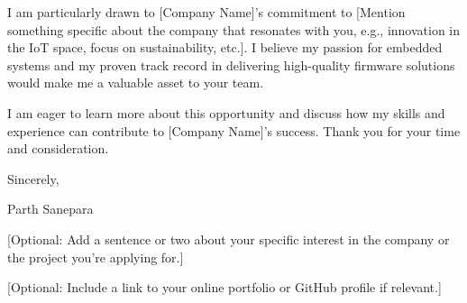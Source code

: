 \documentclass[letterpaper,11pt]{article}
\begin{document}
  I am particularly drawn to [Company Name]'s commitment to [Mention something specific about the company that resonates with you, e.g., innovation in the IoT space, focus on sustainability, etc.]. I believe my passion for embedded systems and my proven track record in delivering high-quality firmware solutions would make me a valuable asset to your team.

  I am eager to learn more about this opportunity and discuss how my skills and experience can contribute to [Company Name]'s success. Thank you for your time and consideration.

\vspace{1cm}

\begin{center}
  Sincerely,

  Parth Sanepara
\end{center}

\vspace{0.5cm}

  [Optional: Add a sentence or two about your specific interest in the company or the project you're applying for.]

  [Optional: Include a link to your online portfolio or GitHub profile if relevant.]
\end{document}
